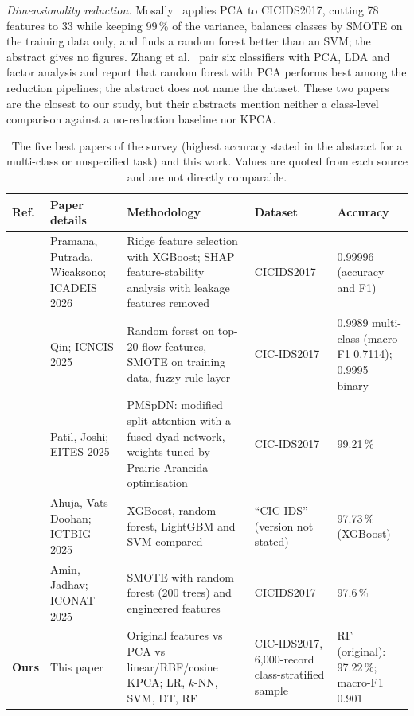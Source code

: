 \documentclass[runningheads]{llncs}
\begin{document}
\textit{Dimensionality reduction.} Mosally~\cite{mosally} applies PCA to CICIDS2017, cutting 78 features to 33 while keeping 99\,\% of the variance, balances classes by SMOTE on the training data only, and finds a random forest better than an SVM; the abstract gives no figures. Zhang et al.~\cite{zhang} pair six classifiers with PCA, LDA and factor analysis and report that random forest with PCA performs best among the reduction pipelines; the abstract does not name the dataset. These two papers are the closest to our study, but their abstracts mention neither a class-level comparison against a no-reduction baseline nor KPCA.

\clearpage
\begin{table}[!t]
\caption{The five best papers of the survey (highest accuracy stated in the abstract for a multi-class or unspecified task) and this work. Values are quoted from each source and are not directly comparable.}\label{tab:lit}
\centering\scriptsize\setlength{\tabcolsep}{3pt}
\begin{tabular}{@{}p{0.55cm}p{3.1cm}p{3.7cm}p{1.9cm}p{2.2cm}@{}}
\toprule
Ref. & Paper details & Methodology & Dataset & Accuracy\\
\midrule
\cite{pramana} & Pramana, Putrada, Wicaksono; ICADEIS 2026 & Ridge feature selection with XGBoost; SHAP feature-stability analysis with leakage features removed & CICIDS2017 & 0.99996 (accuracy and F1)\\
\cite{qin} & Qin; ICNCIS 2025 & Random forest on top-20 flow features, SMOTE on training data, fuzzy rule layer & CIC-IDS2017 & 0.9989 multi-class (macro-F1 0.7114); 0.9995 binary\\
\cite{patilj} & Patil, Joshi; EITES 2025 & PMSpDN: modified split attention with a fused dyad network, weights tuned by Prairie Araneida optimisation & CIC-IDS2017 & 99.21\,\%\\
\cite{ahuja} & Ahuja, Vats Doohan; ICTBIG 2025 & XGBoost, random forest, LightGBM and SVM compared & ``CIC-IDS'' (version not stated) & 97.73\,\% (XGBoost)\\
\cite{amin} & Amin, Jadhav; ICONAT 2025 & SMOTE with random forest (200 trees) and engineered features & CICIDS2017 & 97.6\,\%\\
\midrule
\textbf{Ours} & This paper & Original features vs PCA vs linear/RBF/cosine KPCA; LR, $k$-NN, SVM, DT, RF & CIC-IDS2017, 6,000-record class-stratified sample & RF (original): 97.22\,\%; macro-F1 0.901\\
\bottomrule
\end{tabular}
\end{table}
\end{document}
